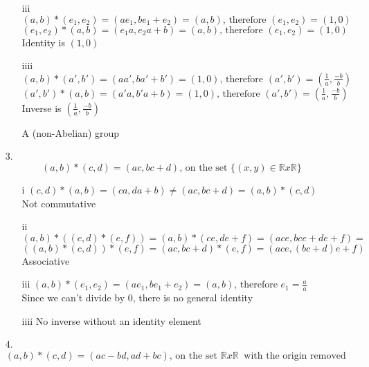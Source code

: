 \begin{enumerate}
\begin{enumerate}
\item[iii]
$(a,b)*(e_{1},e_{2})=(ae_{1},be_{1}+e_{2})=(a,b) \text{, therefore } (e_{1},e_{2})=(1,0) $ \\
$(e_{1},e_{2})*(a,b)=(e_{1}a,e_{2}a+b)=(a,b) \text{, therefore } (e_{1},e_{2})=(1,0) $ \\
Identity is $(1,0)$

\item[iiii]
$(a,b)*(a',b')=(aa',ba'+b')=(1,0) \text{, therefore } (a',b')=(\frac{1}{a},\frac{-b}{b})$ \\
$(a',b')*(a,b)=(a'a,b'a+b)=(1,0) \text{, therefore } (a',b')=(\frac{1}{a},\frac{-b}{b})$ \\
Inverse is $(\frac{1}{a},\frac{-b}{b})$

A (non-Abelian) group

\end{enumerate}

\item[3.]
\begin{equation}
(a,b)*(c,d)=(ac,bc+d) \text{, on the set } \{(x,y) \in \mathbb{R} x \mathbb{R}\}
\end{equation}

\begin{enumerate}

\item[i]
$(c,d)*(a,b)=(ca,da+b) \neq (ac,bc+d)=(a,b)*(c,d)$ \\
Not commutative

\item[ii]
$(a,b)*((c,d)*(e,f))=(a,b)*(ce,de+f)=(ace,bce+de+f)= $ \\
$((a,b)*(c,d))*(e,f)=(ac,bc+d)*(e,f)=(ace,(bc+d)e+f) $ \\
Associative

\item[iii]
$(a,b)*(e_{1},e_{2})=(ae_{1},be_{1}+e_{2})=(a,b) \text{, therefore }  e_{1}=\frac{a}{a}$ \\
Since we can't divide by $0$, there is no general identity

\item[iiii]
No inverse without an identity element

\end{enumerate}

\item[4.]
\begin{equation}
(a,b)*(c,d)=(ac-bd,ad+bc) \text{, on the set } \mathbb{R} x \mathbb{R} \ \text{ with the origin removed}
\end{equation}


\end{enumerate}
